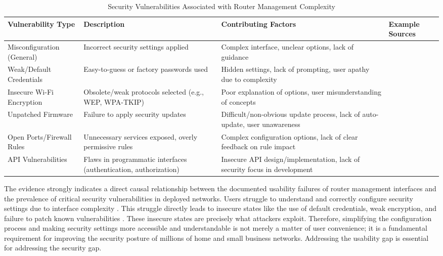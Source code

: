 \begin{table}[htbp]
\caption{Security Vulnerabilities Associated with Router Management Complexity}
\begin{tabular}{|p{3cm}|p{5cm}|p{3cm}|p{2cm}|}
\hline
\textbf{Vulnerability Type} & \textbf{Description} & \textbf{Contributing Factors} & \textbf{Example Sources} \\ \hline
Misconfiguration (General) & Incorrect security settings applied & Complex interface, unclear options, lack of guidance & \cite{home_network_challenges} \\ \hline
Weak/Default Credentials & Easy-to-guess or factory passwords used & Hidden settings, lack of prompting, user apathy due to complexity & \cite{home_network_challenges} \\ \hline
Insecure Wi-Fi Encryption & Obsolete/weak protocols selected (e.g., WEP, WPA-TKIP) & Poor explanation of options, user misunderstanding of concepts & \cite{home_network_challenges} \\ \hline
Unpatched Firmware & Failure to apply security updates & Difficult/non-obvious update process, lack of auto-update, user unawareness & \cite{router_password_study} \\ \hline
Open Ports/Firewall Rules & Unnecessary services exposed, overly permissive rules & Complex configuration options, lack of clear feedback on rule impact & \cite{router_password_study} \\ \hline
API Vulnerabilities & Flaws in programmatic interfaces (authentication, authorization) & Insecure API design/implementation, lack of security focus in development & \cite{secure_router} \\ \hline
\end{tabular}
\end{table}

The evidence strongly indicates a direct causal relationship between the documented usability failures of router management interfaces and the prevalence of critical security vulnerabilities in deployed networks. Users struggle to understand and correctly configure security settings due to interface complexity \cite{home_network_challenges}. This struggle directly leads to insecure states like the use of default credentials, weak encryption, and failure to patch known vulnerabilities \cite{router_password_study}. These insecure states are precisely what attackers exploit. Therefore, simplifying the configuration process and making security settings more accessible and understandable is not merely a matter of user convenience; it is a fundamental requirement for improving the security posture of millions of home and small business networks. Addressing the usability gap is essential for addressing the security gap.

